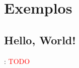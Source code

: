 \section{Exemplos}


\subsection{Hello, World!}


\begin{frame}{\insertsection: \insertsubsection}
  \textcolor{red}{TODO}
\end{frame}
